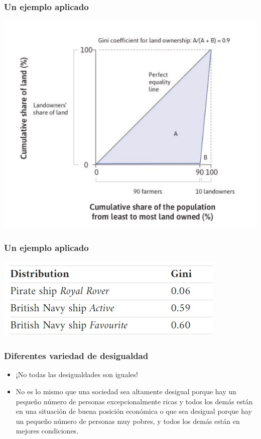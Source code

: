 \documentclass{beamer}
\begin{document}
\begin{frame} 
\frametitle{Un ejemplo aplicado}
    \begin{center}    
    \includegraphics[scale=0.55]{Tema_04.18_lorenz3.jpg}
    \end{center}
\end{frame}

\begin{frame} 
\frametitle{ Un ejemplo aplicado}
    \begin{center}    
    \includegraphics[scale=0.75]{Tema_04.19_gini2.jpg}
    \end{center}
\end{frame}

\begin{frame} 
\frametitle{Diferentes variedad de desigualdad}
\begin{itemize}
\item ¡No todas las desigualdades son iguales!
\item No es lo mismo que una sociedad sea altamente desigual porque hay un pequeño número de personas excepcionalmente ricas y todos los demás están en una situación de buena posición económica o que sea desigual porque hay un pequeño número de personas muy pobres, y todos los demás están en mejores condiciones.
\end{itemize}
\end{frame}
\end{document}
